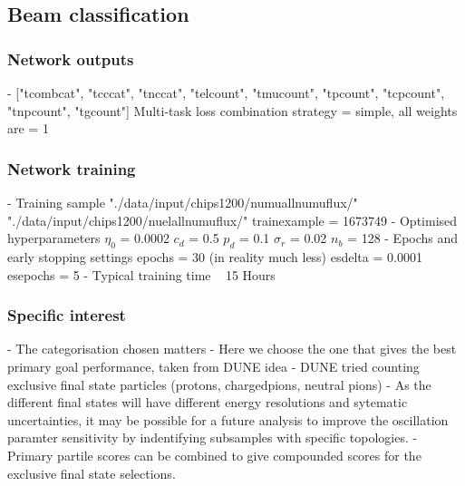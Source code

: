 \subsection{Beam classification}%
\label{sec:cvn_specific_beam} %

\subsubsection*{Network outputs} %
- ["tcombcat", "tcccat", "tnccat", "telcount", "tmucount", "tpcount", "tcpcount", "tnpcount", "tgcount"]
Multi-task loss combination strategy = simple, all weights are = 1
\subsubsection*{Network training} %
- Training sample
"./data/input/chips1200/numuallnumuflux/"
"./data/input/chips1200/nuelallnumuflux/"
trainexample = 1673749
- Optimised hyperparameters
$\eta_{0}$ = 0.0002
$c_{d}$ = 0.5
$p_{d}$ = 0.1
$\sigma_{r}$ = 0.02
$n_{b}$ = 128
- Epochs and early stopping settings
epochs = 30 (in reality much less)
esdelta = 0.0001
esepochs = 5
- Typical training time
~ 15 Hours
\subsubsection*{Specific interest} %
- The categorisation chosen matters
- Here we choose the one that gives the best primary goal performance, taken from DUNE idea
- DUNE tried counting exclusive final state particles (protons, chargedpions, neutral pions)
- As the different final states will have different energy resolutions and sytematic
uncertainties, it may be possible for a future analysis to improve the oscillation paramter
sensitivity by indentifying subsamples with specific topologies.
- Primary partile scores can be combined to give compounded scores for the exclusive final state
selections.

